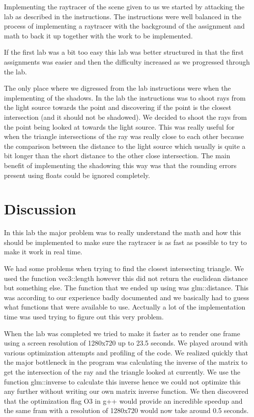 \documentclass[a4]{article}
\begin{document}
Implementing the raytracer of the scene given to us we started by attacking the
lab as described in the instructions. The instructions were well balanced in the
process of implementing a raytracer with the background of the assignment and
math to back it up together with the work to be implemented.

If the first lab was a bit too easy this lab was better structured in that the
first assignments was easier and then the difficulty increased as we progressed
through the lab.

The only place where we digressed from the lab instructions were when the
implementing of the shadows. In the lab the instructions was to shoot rays from
the light source towards the point and discovering if the point is the closest
intersection (and it should not be shadowed). We decided to shoot the rays from
the point being looked at towards the light source. This was really useful for
when the triangle intersections of the ray was really close to each other
because the comparison between the distance to the light source which usually is
quite a bit longer than the short distance to the other close intersection. The
main benefit of implementing the shadowing this way was that the rounding errors
present using floats could be ignored completely.

\section{Discussion}
In this lab the major problem was to really understand the math and how this
should be implemented to make sure the raytracer is as fast as possible to try
to make it work in real time.

We had some problems when trying to find the closest intersecting triangle. We
used the function vec3::length however this did not return the euclidean
distance but something else. The function that we ended up using was
glm::distance. This was according to our experience badly documented and we
basically had to guess what functions that were available to use. Acctually a
lot of the implementation time was used trying to figure out this very problem.

When the lab was completed we tried to make it faster as to render one frame
using a screen resolution of 1280x720 up to 23.5 seconds. We played around with
various optimization attempts and profiling of the code. We realized quickly
that the major bottleneck in the program was calculating the inverse of the
matrix to get the intersection of the ray and the triangle looked at currently.
We use the function glm::inverse to calculate this inverse hence we could not
optimize this any further without writing our own matrix inverse function. We
then discovered that the optimization flag O3 in g++ would provide an incredible
speedup and the same fram with a resolution of 1280x720 would now take around 0.5
seconds.
\end{document}
